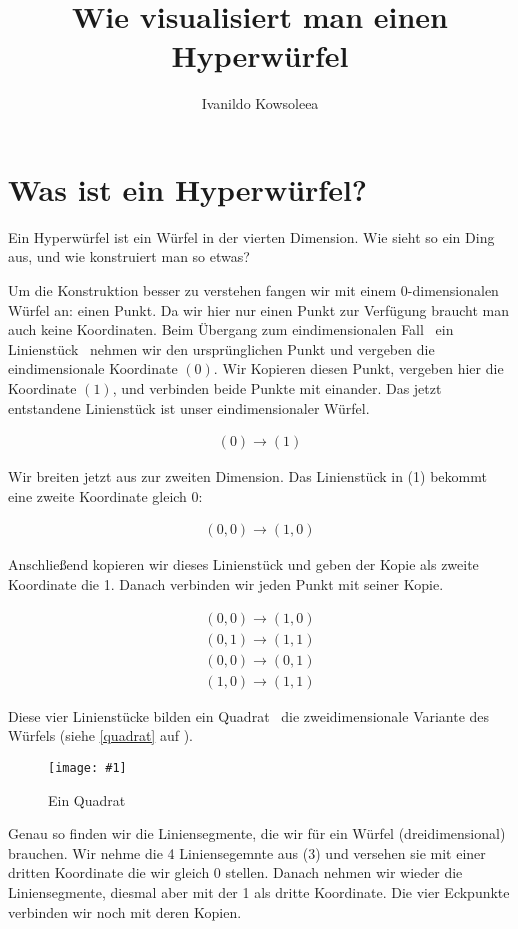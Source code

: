 \documentclass[10pt,a4paper,twoside,titlepage]{article}
\author{Ivanildo Kowsoleea}
\title{Wie visualisiert man einen Hyperwürfel}
\newcommand{\myeq}[2]{
	\begin{equation}
		\begin{split}
			#1
		\end{split}
		\label{#2}
	\end{equation}
}
\newcommand{\image}[4]{
	\begin{figure}[!ht]
		\centering
		\texttt{[image: \#1]}
		\caption{#2}
		#3
	\end{figure}
}
\begin{document}
\maketitle
\tableofcontents
\leading{13pt}

\section{Was ist ein Hyperwürfel?}
Ein Hyperwürfel ist ein Würfel in der vierten Dimension. Wie sieht so
ein Ding aus, und wie konstruiert man so etwas?

Um die Konstruktion besser zu verstehen fangen wir mit einem 0-dimen\-siona\-len
Würfel an: einen Punkt. Da wir hier nur einen Punkt zur Verfügung 
braucht man auch keine Koordinaten. Beim Übergang zum eindimensionalen Fall 
\textemdash\ ein Linienstück \textemdash\ nehmen wir den ursprünglichen Punkt
und vergeben die eindimensionale Koordinate $(0)$. Wir Kopieren diesen Punkt,
vergeben hier die Koordinate $(1)$, und verbinden beide Punkte mit einander.
Das jetzt entstandene Linienstück ist unser eindimensionaler Würfel.

\myeq{(0)\rightarrow (1)}{dim1}

Wir breiten jetzt aus zur zweiten Dimension. Das Linienstück in (1)
bekommt eine zweite Koordinate gleich 0:
\myeq{(0,0)\rightarrow (1,0)}{dim1in2}
Anschließend kopieren wir dieses Linienstück und geben der Kopie als zweite
Koordinate die 1. Danach verbinden wir jeden Punkt mit seiner Kopie.

\myeq{(0,0)\rightarrow (1,0)\\
	(0,1)\rightarrow(1,1)\\
	(0,0)\rightarrow(0,1)\\
	(1,0)\rightarrow(1,1)}{dim2}
	
Diese vier Linienstücke bilden ein Quadrat \textemdash\ die zweidimensionale
Variante des Würfels (siehe \autoref{quadrat} auf ).

\image{img/quadrat.eps}{Ein Quadrat}{\label{quadrat}}{5}

Genau so finden wir die Liniensegmente, die wir für ein Würfel (dreidimensional)
brauchen. Wir nehme die 4 Liniensegemnte aus (3) und versehen sie mit einer
dritten Koordinate die wir gleich 0 stellen. Danach nehmen wir wieder die 
Liniensegmente, diesmal aber mit der 1 als dritte Koordinate. Die 
vier Eckpunkte verbinden wir noch mit deren Kopien.
\end{document}
